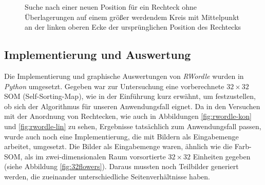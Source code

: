 \documentclass[12pt, ngerman, utf8]{article}
\begin{document}
\begin{figure}[h]
    \noindent
    \caption{Suche nach einer neuen Position für ein Rechteck ohne Überlagerungen auf einem größer werdendem Kreis mit Mittelpunkt an der linken oberen Ecke der ursprünglichen Position des Rechtecks}
    \label{fig:rwordle-illus}
\end{figure}

\subsection{Implementierung und Auswertung}
Die Implementierung und graphische Auswertungen von \emph{RWordle} wurden in \emph{Python} umgesetzt.
Gegeben war zur Untersuchung eine vorberechnete $32\times32$ SOM (Self-Sorting-Map), wie in der Einführung kurz erwähnt, um festzustellen, ob sich der Algorithmus für unseren Anwendungsfall eignet. Da in den Versuchen mit der Anordnung von Rechtecken, wie auch in Abbildungen \ref{fig:rwordle-kon} und \ref{fig:rwordle-lin} zu sehen, Ergebnisse tatsächlich zum Anwendungsfall passen, wurde auch noch eine Implementierung, die mit Bildern als Eingabemenge arbeitet, umgesetzt.
Die Bilder als Eingabemenge waren, ähnlich wie die Farb-SOM, als im zwei-dimensionalen Raum vorsortierte $32\times32$ Einheiten gegeben (siehe Abbildung \ref{fig:32flowers}). Daraus mussten noch Teilbilder generiert werden, die zueinander unterschiedliche Seitenverhältnisse haben.
\end{document}
